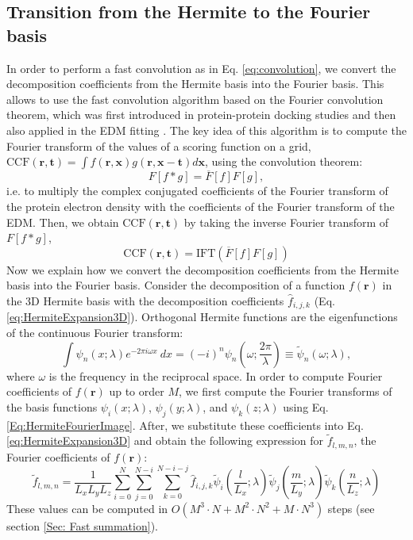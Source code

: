 \subsection{Transition from the Hermite to the Fourier basis}
\label{Sec: HermiteFourierTransition}
In order to perform a fast convolution as in Eq. \ref{eq:convolution}, we
convert the decomposition coefficients from the Hermite basis into
the Fourier basis. This allows to use the fast convolution algorithm
based on the Fourier convolution theorem,
which was first introduced in protein-protein docking studies \cite{Katchalski-Katzir1992,Gabb1997}
and then also applied in the EDM fitting \cite{Chacon2002,Wriggers2010,Siebert2009}. 
The key idea of this algorithm is to compute the Fourier transform
of the values of a scoring function on a grid, $\textrm{CCF}(\mathbf{r}, \mathbf{t})=\int f(\mathbf{r},\mathbf{x})g(\mathbf{r},\mathbf{x}-\mathbf{t})d\mathbf{x}$,
using the convolution theorem:
%
\begin{equation}
F\left[f*g\right]=\overline{F}[f]F[g],
\end{equation}
i.e. to multiply the complex conjugated coefficients of the Fourier transform of the protein electron density
with the coefficients of the Fourier transform of the EDM. Then, we obtain $\textrm{CCF}(\mathbf{r}, \mathbf{t})$
by taking the inverse Fourier transform of $F\left[f*g\right]$,
%
\begin{equation}
\textrm{CCF}(\mathbf{r}, \mathbf{t})=\textrm{IFT}\left(\overline{F}[f]F[g]\right)
\end{equation}
%
Now we explain how we convert the decomposition coefficients from
the Hermite basis into the Fourier basis. 
Consider the decomposition
of a function $f(\mathbf{r})$ in the 3D Hermite basis with the decomposition
coefficients $\hat{f}_{i,j,k}$ (Eq. \ref{eq:HermiteExpansion3D}).
%
Orthogonal Hermite functions are the eigenfunctions of the continuous Fourier transform:
\begin{equation}
\int \psi_{n}(x;\lambda) e^{-2\pi i \omega x}~dx = (-i)^n \psi_{n}(\omega;\frac{2\pi}{\lambda})
\equiv \tilde{\psi}_{n}(\omega;\lambda),
 \label{Eq:HermiteFourierImage}
\end{equation}
where $\omega$ is the frequency in the reciprocal space.
%
In order to compute  Fourier coefficients of $f(\mathbf{r})$ up to order $M$,
we first compute the Fourier transforms of the basis functions $\psi_{i}(x;\lambda)$,
$\psi_{j}(y;\lambda)$, and $\psi_{k}(z;\lambda)$ using Eq. \ref{Eq:HermiteFourierImage}.
After, we substitute these coefficients into Eq. \ref{eq:HermiteExpansion3D} and obtain
the following expression for $\tilde{f}_{l,m,n}$, the Fourier coefficients
of $f(\mathbf{r})$:
\begin{equation}
\tilde{f}_{l,m,n}=\frac{1}{L_x L_y L_z}\sum_{i=0}^{N}\sum_{j=0}^{N-i}\sum_{k=0}^{N-i-j}\hat{f}_{i,j,k}\tilde{\psi}_{i}(\frac{l}{L_x};\lambda)\tilde{\psi}_{j}(\frac{m}{L_y};\lambda)\tilde{\psi}_{k}(\frac{n}{L_z};\lambda)
\label{eq:HermiteFourierSum}
\end{equation}
These values can be computed in $O(M^{3}\cdot N+M^{2}\cdot N^{2}+M\cdot N^{3})$
steps (see section \ref{Sec: Fast summation}).


